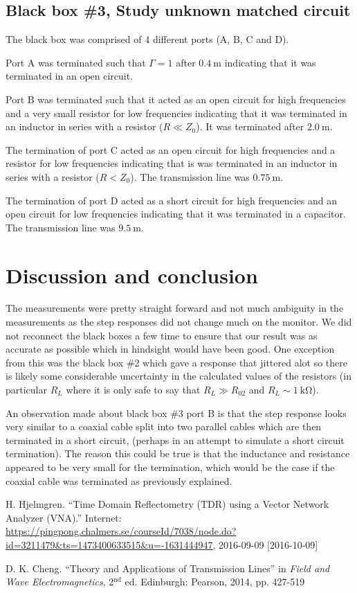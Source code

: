 \documentclass[12pt,a4paper]{article}
\begin{document}
\subsection{Black box \#3, Study unknown matched circuit}
The black box was comprised of 4 different ports (A, B, C and D).

Port A was terminated such that $\Gamma=1$ after $\SI{0.4}{\metre}$ indicating that it was terminated in an open circuit.

Port B was terminated such that it acted as an open circuit for high frequencies and a very small resistor for low frequencies indicating that it was terminated in an inductor in series with a resistor ($R\ll Z_0$). It was terminated after $\SI{2.0}{\metre}$.

The termination of port C acted as an open circuit for high frequencies and a resistor for low frequencies indicating that is was terminated in an inductor in series with a resistor ($R<Z_{0}$). The transmission line was $\SI{0.75}{\metre}$.

The termination of port D acted as a short circuit for high frequencies and an open circuit for low frequencies indicating that it was terminated in a capacitor. The transmission line was $\SI{9.5}{\metre}$.

\section{Discussion and conclusion}
The measurements were pretty straight forward and not much ambiguity in the measurements as the step responses did not change much on the monitor. We did not reconnect the black boxes a few time to ensure that our result was as accurate as possible which in hindsight would have been good. One exception from this was the black box \#2 which gave a response that jittered alot so there is likely some considerable uncertainty in the calculated values of the resistors (in particular $R_{L}$ where it is only safe to say that $R_{L}\gg R_{02}$ and $R_{L}\sim\SI{1}{\kilo\ohm}$).

An observation made about black box \#3 port B is that the step response looks very similar to a coaxial cable split into two parallel cables which are then terminated in a short circuit, (perhaps in an attempt to simulate a short circuit termination). The reason this could be true is that the inductance and resistance appeared to be very small for the termination, which would be the case if the coaxial cable was terminated as previously explained.

\newpage
\begin{thebibliography}{1}

 H. Hjelmgren. ``Time Domain Reflectometry (TDR) using a Vector Network Analyzer (VNA).'' Internet: \url{https://pingpong.chalmers.se/courseId/7038/node.do?id=3211479&ts=1473400633515&u=-1631444947}, 2016-09-09 [2016-10-09]

 D. K. Cheng. ``Theory and Applications of Transmission Lines'' in \textit{Field and Wave Electromagnetics}, 2$^{\text{nd}}$ ed. Edinburgh: Pearson, 2014, pp. 427-519

\end{thebibliography}
\end{document}
